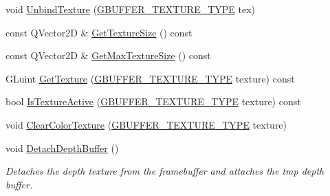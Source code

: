 \begin{DoxyCompactItemize}
\item 
void \mbox{\hyperlink{class_geometry_engine_1_1_geometry_buffer_1_1_g_buffer_a15ffb63e72295abb6a10b2481fb878e4}{Unbind\+Texture}} (\mbox{\hyperlink{class_geometry_engine_1_1_geometry_buffer_1_1_g_buffer_a718dceafcac1915f7de061108597e1cc}{G\+B\+U\+F\+F\+E\+R\+\_\+\+T\+E\+X\+T\+U\+R\+E\+\_\+\+T\+Y\+PE}} tex)
\item 
const Q\+Vector2D \& \mbox{\hyperlink{class_geometry_engine_1_1_geometry_buffer_1_1_g_buffer_a2b829115597fc587cd6f4ddb52b875cc}{Get\+Texture\+Size}} () const
\item 
const Q\+Vector2D \& \mbox{\hyperlink{class_geometry_engine_1_1_geometry_buffer_1_1_g_buffer_a47bda4849000d2728538de4e2f27f11a}{Get\+Max\+Texture\+Size}} () const
\item 
G\+Luint \mbox{\hyperlink{class_geometry_engine_1_1_geometry_buffer_1_1_g_buffer_a798b7520f23c545e09d58639bd275f16}{Get\+Texture}} (\mbox{\hyperlink{class_geometry_engine_1_1_geometry_buffer_1_1_g_buffer_a718dceafcac1915f7de061108597e1cc}{G\+B\+U\+F\+F\+E\+R\+\_\+\+T\+E\+X\+T\+U\+R\+E\+\_\+\+T\+Y\+PE}} texture) const
\item 
bool \mbox{\hyperlink{class_geometry_engine_1_1_geometry_buffer_1_1_g_buffer_a66ccde86e455532b2eac771163570f04}{Is\+Texture\+Active}} (\mbox{\hyperlink{class_geometry_engine_1_1_geometry_buffer_1_1_g_buffer_a718dceafcac1915f7de061108597e1cc}{G\+B\+U\+F\+F\+E\+R\+\_\+\+T\+E\+X\+T\+U\+R\+E\+\_\+\+T\+Y\+PE}} texture) const
\item 
void \mbox{\hyperlink{class_geometry_engine_1_1_geometry_buffer_1_1_g_buffer_abf39c85cb87eaf0475205b59333253c0}{Clear\+Color\+Texture}} (\mbox{\hyperlink{class_geometry_engine_1_1_geometry_buffer_1_1_g_buffer_a718dceafcac1915f7de061108597e1cc}{G\+B\+U\+F\+F\+E\+R\+\_\+\+T\+E\+X\+T\+U\+R\+E\+\_\+\+T\+Y\+PE}} texture)
\item 
\mbox{\label{class_geometry_engine_1_1_geometry_buffer_1_1_g_buffer_a9d3ac4fcb577f48c5d7e7f023109cec0}} 
void \mbox{\hyperlink{class_geometry_engine_1_1_geometry_buffer_1_1_g_buffer_a9d3ac4fcb577f48c5d7e7f023109cec0}{Detach\+Depth\+Buffer}} ()
\begin{DoxyCompactList}\small\item\em Detaches the depth texture from the framebuffer and attaches the tmp depth buffer. \end{DoxyCompactList}\item 
\mbox{\label{class_geometry_engine_1_1_geometry_buffer_1_1_g_buffer_a5101a82324f81ed73a1380d1ac97ce7f}} 

\end{DoxyCompactItemize}
